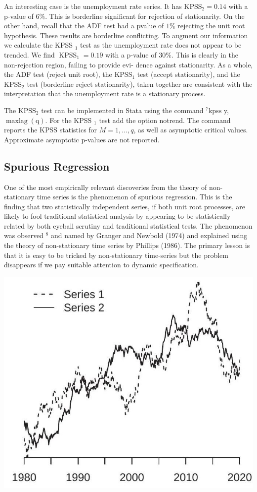 \documentclass[10pt]{article}
\begin{document}
An interesting case is the unemployment rate series. It has $\mathrm{KPSS}_{2}=0.14$ with a p-value of $6 \%$. This is borderline significant for rejection of stationarity. On the other hand, recall that the ADF test had a pvalue of $1 \%$ rejecting the unit root hypothesis. These results are borderline conflicting. To augment our information we calculate the KPSS $_{1}$ test as the unemployment rate does not appear to be trended. We find $\operatorname{KPSS}_{1}=0.19$ with a p-value of $30 \%$. This is clearly in the non-rejection region, failing to provide evi- dence against stationarity. As a whole, the ADF test (reject unit root), the $\mathrm{KPSS}_{1}$ test (accept stationarity), and the $\mathrm{KPSS}_{2}$ test (borderline reject stationarity), taken together are consistent with the interpretation that the unemployment rate is a stationary process.

The $\mathrm{KPSS}_{2}$ test can be implemented in Stata using the command ${ }^{7} \mathrm{kpss}$ y, $\operatorname{maxlag}(\mathrm{q})$. For the KPSS $_{1}$ test add the option notrend. The command reports the KPSS statistics for $M=1, \ldots, q$, as well as asymptotic critical values. Approximate asymptotic p-values are not reported.

\subsection{Spurious Regression}
One of the most empirically relevant discoveries from the theory of non-stationary time series is the phenomenon of spurious regression. This is the finding that two statistically independent series, if both unit root processes, are likely to fool traditional statistical analysis by appearing to be statistically related by both eyeball scrutiny and traditional statistical tests. The phenomenon was observed ${ }^{8}$ and named by Granger and Newbold (1974) and explained using the theory of non-stationary time series by Phillips (1986). The primary lesson is that it is easy to be tricked by non-stationary time-series but the problem disappears if we pay suitable attention to dynamic specification.

\includegraphics[max width=\textwidth]{2022_10_23_e99fc7c58db661c6f219g-25}
\end{document}
